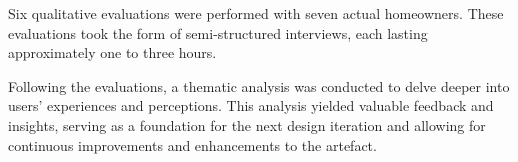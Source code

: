 Six qualitative evaluations were performed with seven actual homeowners. 
These evaluations took the form of semi-structured interviews, each lasting approximately one to three hours.

Following the evaluations, a thematic analysis was conducted to delve deeper into users' experiences and perceptions. 
This analysis yielded valuable feedback and insights, serving as a foundation for the next design iteration and allowing for continuous improvements and enhancements to the artefact.

